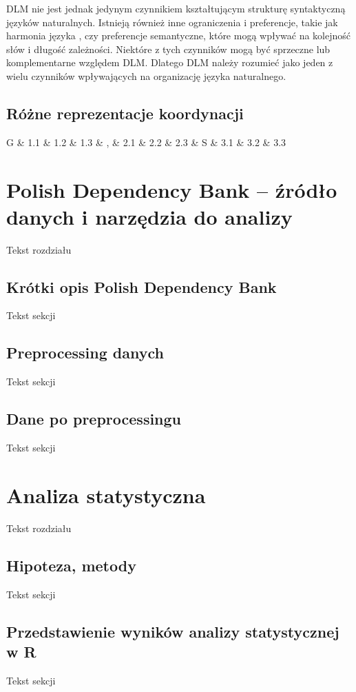 \documentclass[licencjacka]{pracamgr_Kogni}
\begin{document}
DLM nie jest jednak jedynym czynnikiem kształtującym strukturę syntaktyczną języków naturalnych. Istnieją również inne ograniczenia i preferencje, takie jak harmonia języka \citep{Jing2022}, czy preferencje semantyczne, które mogą wpływać na kolejność słów i długość zależności. Niektóre z tych czynników mogą być sprzeczne lub komplementarne względem DLM. Dlatego DLM należy rozumieć jako jeden z wielu czynników wpływających na organizację języka naturalnego.

\section{Różne reprezentacje koordynacji}
\begin{dependency}[theme = simple]
    \begin{deptext}[column sep=1em]
       G \& 1.1 \& 1.2 \& 1.3 \& , \& 2.1 \& 2.2 \& 2.3 \& S \& 3.1 \& 3.2 \& 3.3 \\
    \end{deptext}
 \end{dependency}

\chapter{Polish Dependency Bank -- źródło danych i narzędzia do analizy}
Tekst rozdziału
\section{Krótki opis Polish Dependency Bank}
Tekst sekcji
\section{Preprocessing danych}
Tekst sekcji
\section{Dane po preprocessingu}
Tekst sekcji

\chapter{Analiza statystyczna}
Tekst rozdziału
\section{Hipoteza, metody}
Tekst sekcji
\section{Przedstawienie wyników analizy statystycznej w R}
Tekst sekcji
\end{document}
